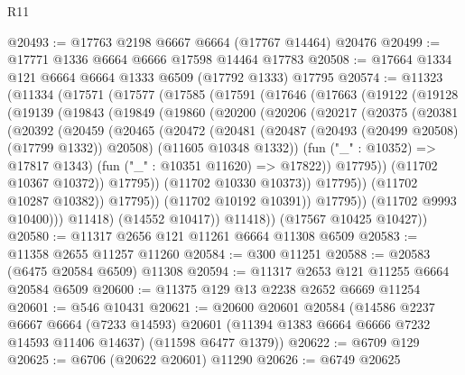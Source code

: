 \begin{lexlean}{R11}
\begin{coremodule}
@20493 := @17763 @2198 @6667 @6664 (@17767 @14464) @20476
@20499 := @17771 @1336 @6664 @6666 @17598 @14464 @17783
@20508 := @17664 @1334 @121 @6664 @6664 @1333 @6509 (@17792 @1333) @17795
@20574 := @11323
    (@11334
      (@17571
        (@17577
          (@17585
            (@17591
              (@17646
                (@17663
                  (@19122
                    (@19128
                      (@19139
                        (@19843
                          (@19849
                            (@19860
                              (@20200
                                (@20206
                                  (@20217
                                    (@20375
                                      (@20381
                                        (@20392
                                          (@20459
                                            (@20465
                                              (@20472
                                                (@20481
                                                  (@20487
                                                    (@20493 (@20499 @20508) (@17799 @1332))
                                                    @20508)
                                                  (@11605 @10348 @1332))
                                                (fun ("_" : @10352) => @17817 @1343)
                                                (fun ("_" : @10351 @11620) => @17822))
                                              @17795))
                                          (@11702 @10367 @10372))
                                        @17795))
                                    (@11702 @10330 @10373))
                                  @17795))
                              (@11702 @10287 @10382))
                            @17795))
                        (@11702 @10192 @10391))
                      @17795))
                  (@11702 @9993 @10400)))
              @11418)
            (@14552 @10417))
          @11418))
      (@17567 @10425 @10427))
@20580 := @11317 @2656 @121 @11261 @6664 @11308 @6509
@20583 := @11358 @2655 @11257 @11260
@20584 := @300 @11251
@20588 := @20583 (@6475 @20584 @6509) @11308
@20594 := @11317 @2653 @121 @11255 @6664 @20584 @6509
@20600 := @11375 @129 @13 @2238 @2652 @6669 @11254
@20601 := @546 @10431
@20621 := @20600
    @20601
    @20584
    (@14586
      @2237
      @6667
      @6664
      (@7233 @14593)
      @20601
      (@11394 @1383 @6664 @6666 @7232 @14593 @11406 @14637)
      (@11598 @6477 @1379))
@20622 := @6709 @129
@20625 := @6706 (@20622 @20601) @11290
@20626 := @6749 @20625

\end{coremodule}
\end{lexlean}
